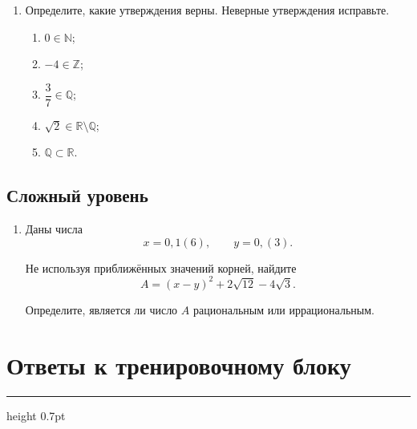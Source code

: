 \documentclass[a4paper,12pt]{article}
\newcommand{\N}{\mathbb{N}}
\newcommand{\Z}{\mathbb{Z}}
\newcommand{\Q}{\mathbb{Q}}
\newcommand{\R}{\mathbb{R}}
\newcommand{\ruleline}{%
    \par\medskip
    {\color{accent}\hrule height 0.7pt}
    \medskip
}
\begin{document}
\begin{enumerate}[start=4]
\begin{enumerate}[label=\arabic*)]
    \item \(\sqrt{12}+\sqrt3\);
    \item \((\sqrt5+1)(\sqrt5-1)\);
    \item \(\dfrac{\sqrt{50}}{\sqrt2}\).
\end{enumerate}

\item
Определите, какие утверждения верны.
Неверные утверждения исправьте.

\begin{enumerate}[label=\arabic*)]
    \item \(0\in\N\);
    \item \(-4\in\Z\);
    \item \(\dfrac37\in\Q\);
    \item \(\sqrt2\in\R\setminus\Q\);
    \item \(\Q\subset\R\).
\end{enumerate}

\end{enumerate}

\subsection*{\textcolor{darkaccent}{Сложный уровень}}

\begin{enumerate}[start=10]

\item
Даны числа
\[
x=0{,}1(6),
\qquad
y=0{,}(3).
\]

Не используя приближённых значений корней, найдите
\[
A=(x-y)^2+2\sqrt{12}-4\sqrt3.
\]

Определите, является ли число \(A\) рациональным или иррациональным.

\end{enumerate}


\newpage

\section*{\textcolor{darkaccent}{Ответы к тренировочному блоку}}

\ruleline

\renewcommand{\arraystretch}{1.45}
\end{document}
